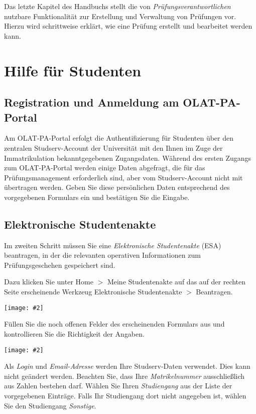 \documentclass[a4paper,11pt]{article}
\newcommand{\bild}[2]{
    \begin{center}\texttt{[image: \#2]}\end{center}
}
\newcommand{\knopf}[1]{{\sc #1}}
\begin{document}
Das letzte Kapitel des Handbuchs stellt die von {\em Prüfungsverantwortlichen}
nutzbare Funktionalität zur Erstellung und Verwaltung von Prüfungen vor.
Hierzu wird schrittweise erklärt, wie eine Prüfung erstellt und bearbeitet
werden kann.

\clearpage
\section{Hilfe für Studenten}

\subsection{Registration und Anmeldung am OLAT-PA-Portal}

Am OLAT-PA-Portal erfolgt die Authentifizierung für Studenten über den
zentralen Studserv-Account der Universität mit den Ihnen im Zuge der
Immatrikulation bekanntgegebenen Zugangsdaten.  Während des ersten Zugangs zum
OLAT-PA-Portal werden einige Daten abgefragt, die für das Prüfungsmanagement
erforderlich sind, aber vom Studserv-Account nicht mit übertragen werden.
Geben Sie diese persönlichen Daten entsprechend des vorgegebenen Formulars ein
und bestätigen Sie die Eingabe.

\subsection{Elektronische Studentenakte}

Im zweiten Schritt müssen Sie eine {\em Elektronische Studentenakte} (ESA)
beantragen, in der die relevanten operativen Informationen zum
Prüfungsgeschehen gespeichert sind. 

Dazu klicken Sie unter \knopf{Home $>$ Meine Studentenakte} auf das auf der
rechten Seite erscheinende Werkzeug \knopf{Elektronische Studentenakte $>$
  Beantragen}.

\bild{.95}{ESA-Beantragen}

Füllen Sie die noch offenen Felder des erscheinenden Formulars aus und
kontrollieren Sie die Richtigkeit der Angaben.

\bild{.7}{ESA-Eingaben}

Als {\em Login} und {\em Email-Adresse} werden Ihre Studserv-Daten verwendet.
Dies kann nicht geändert werden.  Beachten Sie, dass Ihre {\em Matrikelnummer}
ausschließlich aus Zahlen bestehen darf.  Wählen Sie Ihren {\em Studiengang}
aus der Liste der vorgegebenen Einträge.  Falls Ihr Studiengang dort nicht
angegeben ist, wählen Sie den Studiengang {\em Sonstige}.
\end{document}
